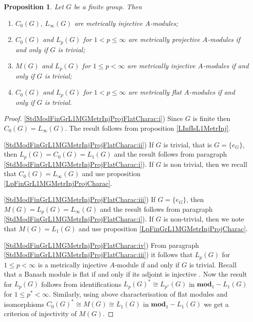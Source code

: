 \documentclass{article}
\theoremstyle{plain}
\newtheorem{proposition}{Proposition}[section]
\theoremstyle{definition}
\newtheorem{proof}{Proof}\def\theproof{}
\newcommand{\isom}{\mathop{\mathbin{\cong}}}
\begin{document}
\begin{fulltext}
\begin{proposition}\label{StdModFinGrL1MGMetrInjProjFlatCharac} Let $G$ be a finite group. Then
\begin{enumerate}
    \item $C_0(G)$, $L_\infty(G)$ are metrically injective $A$-modules;
    \label{StdModFinGrL1MGMetrInjProjFlatCharac:i}
    \item $C_0(G)$ and $L_p(G)$ for $1<p\leq\infty$ are metrically projective $A$-modules if and 
    only if $G$ is trivial;
    \label{StdModFinGrL1MGMetrInjProjFlatCharac:ii}
    \item $M(G)$ and $L_p(G)$ for $1\leq p<\infty$ are metrically injective  $A$-modules if and 
    only if $G$ is trivial;
    \label{StdModFinGrL1MGMetrInjProjFlatCharac:iii}
    \item $C_0(G)$ and $L_p(G)$ for $1<p\leq\infty$ are metrically flat $A$-modules if and 
    only if $G$ is trivial.
    \label{StdModFinGrL1MGMetrInjProjFlatCharac:iv}
\end{enumerate}
\end{proposition}
\begin{proof}
\ref{StdModFinGrL1MGMetrInjProjFlatCharac:i}) Since $G$ is finite then $C_0(G)=L_\infty(G)$. 
The result follows from proposition 
\ref{LInfIsL1MetrInj}.

\ref{StdModFinGrL1MGMetrInjProjFlatCharac:ii}) If $G$ is trivial, that is $G=\{e_G\}$, 
then $L_p(G)=C_0(G)=L_1(G)$ and the result 
follows from paragraph \ref{StdModFinGrL1MGMetrInjProjFlatCharac:i}). If $G$ is non trivial, 
then we recall that 
$C_0(G)=L_\infty(G)$ and use proposition \ref{LpFinGrL1MGMetrInjProjCharac}.

\ref{StdModFinGrL1MGMetrInjProjFlatCharac:iii}) If $G=\{e_G\}$, then $M(G)=L_p(G)=L_\infty(G)$ 
and the result follows from paragraph \ref{StdModFinGrL1MGMetrInjProjFlatCharac:i}). 
If $G$ is non-trivial, then we note that $M(G)=L_1(G)$ and use proposition 
\ref{LpFinGrL1MGMetrInjProjCharac}.

\ref{StdModFinGrL1MGMetrInjProjFlatCharac:iv}) From paragraph \ref{StdModFinGrL1MGMetrInjProjFlatCharac:iii}) 
it follows that $L_p(G)$ for $1\leq p<\infty$ is a metrically 
injective $A$-module if and only if $G$ is trivial. Recall that a Banach module is flat if and 
only if its adjoint is injective \cite[proposition 2.21]{NemGeomProjInjFlatBanMod}. Now the 
result for $L_p(G)$ follows from identifications $L_p(G)^*\isom L_{p^*}(G)$ in 
$\mathbf{mod}_1-L_1(G)$ for $1\leq p^*<\infty$. Similarly, using above characterisation of flat 
modules and isomorphisms $C_0(G)^*\isom M(G)\isom L_1(G)$ in $\mathbf{mod}_1-L_1(G)$ we get a 
criterion of injectivity of $M(G)$.
\end{proof}


\end{fulltext}
\end{document}
